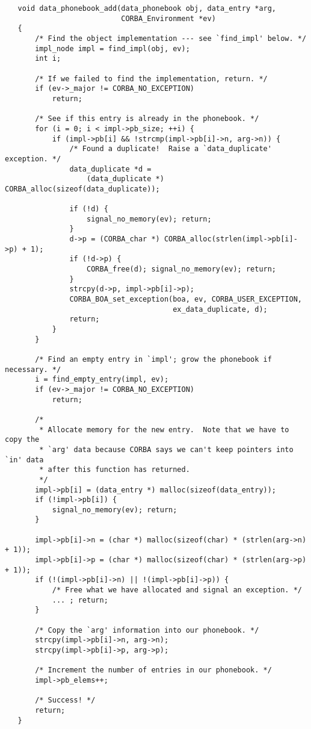 \begin{verbatim}
   void data_phonebook_add(data_phonebook obj, data_entry *arg,
                           CORBA_Environment *ev)
   {
       /* Find the object implementation --- see `find_impl' below. */
       impl_node impl = find_impl(obj, ev);
       int i;

       /* If we failed to find the implementation, return. */
       if (ev->_major != CORBA_NO_EXCEPTION)
           return;

       /* See if this entry is already in the phonebook. */
       for (i = 0; i < impl->pb_size; ++i) {
           if (impl->pb[i] && !strcmp(impl->pb[i]->n, arg->n)) {
               /* Found a duplicate!  Raise a `data_duplicate' exception. */
               data_duplicate *d =
                   (data_duplicate *) CORBA_alloc(sizeof(data_duplicate));

               if (!d) {
                   signal_no_memory(ev); return;
               }
               d->p = (CORBA_char *) CORBA_alloc(strlen(impl->pb[i]->p) + 1);
               if (!d->p) {
                   CORBA_free(d); signal_no_memory(ev); return;
               }
               strcpy(d->p, impl->pb[i]->p);
               CORBA_BOA_set_exception(boa, ev, CORBA_USER_EXCEPTION,
                                       ex_data_duplicate, d);
               return;
           }
       }

       /* Find an empty entry in `impl'; grow the phonebook if necessary. */
       i = find_empty_entry(impl, ev);
       if (ev->_major != CORBA_NO_EXCEPTION)
           return;

       /*
        * Allocate memory for the new entry.  Note that we have to copy the
        * `arg' data because CORBA says we can't keep pointers into `in' data
        * after this function has returned.
        */
       impl->pb[i] = (data_entry *) malloc(sizeof(data_entry));
       if (!impl->pb[i]) {
           signal_no_memory(ev); return;
       }

       impl->pb[i]->n = (char *) malloc(sizeof(char) * (strlen(arg->n) + 1));
       impl->pb[i]->p = (char *) malloc(sizeof(char) * (strlen(arg->p) + 1));
       if (!(impl->pb[i]->n) || !(impl->pb[i]->p)) {
           /* Free what we have allocated and signal an exception. */
           ... ; return;
       }

       /* Copy the `arg' information into our phonebook. */
       strcpy(impl->pb[i]->n, arg->n);
       strcpy(impl->pb[i]->p, arg->p);

       /* Increment the number of entries in our phonebook. */
       impl->pb_elems++;

       /* Success! */
       return;
   }
\end{verbatim}

